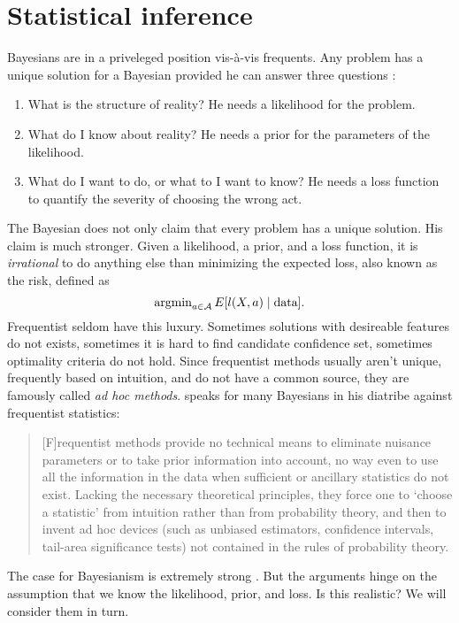 \section{Statistical inference}

Bayesians are in a priveleged position vis-à-vis frequents. Any problem
has a unique solution for a Bayesian provided he can answer three
questions \parencite[Chapter 2]{Robert2007-ri}:
\begin{enumerate}
\item What is the structure of reality? He needs a likelihood for the problem. 
\item What do I know about reality? He needs a prior for the parameters
of the likelihood.
\item What do I want to do, or what to I want to know? He needs a loss function
to quantify the severity of choosing the wrong act.
\end{enumerate}
The Bayesian does not only claim that every problem has a unique solution.
His claim is much stronger. Given a likelihood, a prior, and a loss
function, it is \emph{irrational} to do anything else than minimizing
the expected loss, also known as the risk, defined as
\begin{equation}
\operatorname{argmin}_{a\in\mathcal{A}}E[l(X,a)\mid\textrm{data}].\label{eq:risk minimization}
\end{equation}
Frequentist seldom have this luxury. Sometimes solutions with desireable
features do not exists, sometimes it is hard to find candidate confidence
set, sometimes optimality criteria do not hold. Since frequentist
methods usually aren't unique, frequently based on intuition, and
do not have a common source, they are famously called \emph{ad hoc
methods}. \cite[p. xxiii]{Jaynes2003-ky} speaks for many Bayesians
in his diatribe against frequentist statistics:
\begin{quote}
{[}F{]}requentist methods provide no technical means to eliminate
nuisance parameters or to take prior information into account, no
way even to use all the information in the data when sufficient or
ancillary statistics do not exist. Lacking the necessary theoretical
principles, they force one to \textquoteleft choose a statistic\textquoteright{}
from intuition rather than from probability theory, and then to invent
ad hoc devices (such as unbiased estimators, confidence intervals,
tail-area significance tests) not contained in the rules of probability
theory.
\end{quote}
The case for Bayesianism is extremely strong \parencite{Berger1988-ji,Bernardo2009-wv}.
But the arguments hinge on the assumption that we know the likelihood,
prior, and loss. Is this realistic? We will consider them in turn. 

